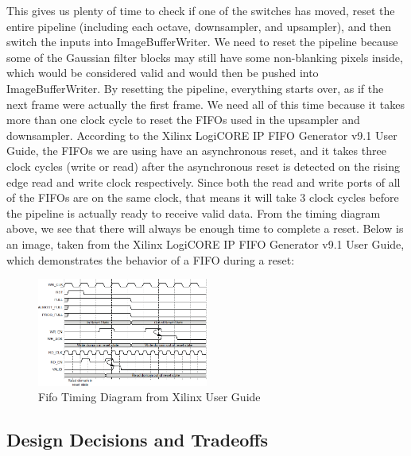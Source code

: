 This gives us plenty of time to check if one of the switches has moved, reset 
the entire pipeline (including each octave, downsampler, and upsampler), and 
then switch the inputs into ImageBufferWriter. We need to reset the pipeline 
because some of the Gaussian filter blocks may still have some non-blanking 
pixels inside, which would be considered valid and would then be pushed into 
ImageBufferWriter. By resetting the pipeline, everything starts over, as if the 
next frame were actually the first frame. We need all of this time because it 
takes more than one clock cycle to reset the FIFOs used in the upsampler and 
downsampler. According to the Xilinx LogiCORE IP FIFO Generator v9.1 User Guide, 
the FIFOs we are using have an asynchronous reset, and it takes three clock 
cycles (write or read) after the asynchronous reset is detected on the rising 
edge read and write clock respectively. Since both the read and write ports 
of all of the FIFOs are on the same clock, that means it will take 3 clock 
cycles before the pipeline is actually ready to receive valid data. From the 
timing diagram above, we see that there will always be enough time to complete 
a reset. Below is an image, taken from the Xilinx LogiCORE IP FIFO Generator 
v9.1 User Guide, which demonstrates the behavior of a FIFO during a reset: 

\begin{figure}
    \includegraphics[width=0.5\textwidth]{processed_image_pngs/fifo_timing.png}
    \caption{Fifo Timing Diagram from Xilinx User Guide}
    \label{fig:fifo_timing}
\end{figure}




\subsection{Design Decisions and Tradeoffs}

